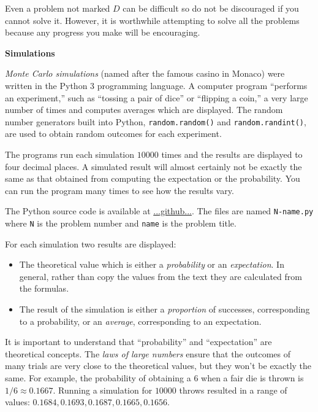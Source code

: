 Even a problem not marked $D$ can be difficult so do not be discouraged if you cannot solve it. However, it is worthwhile attempting to solve all the problems because any progress you make will be encouraging.

\newpage

\textbf{Simulations}

\emph{Monte Carlo simulations} (named after the famous casino in Monaco) were written in the Python 3 programming language. A computer program ``performs an experiment,'' such as ``tossing a pair of dice'' or ``flipping a coin,'' a very large number of times and computes averages which are displayed. The random number generators built into Python, \verb+random.random()+ and \verb+random.randint()+, are used to obtain random outcomes for each experiment.

The programs run each simulation $10000$ times and the results are displayed to four decimal places. A simulated result will almost certainly not be exactly the same as that obtained from computing the expectation or the probability. You can run the program many times to see how the results vary.

The Python source code is available at \url{...github...}. The files are named \verb+N-name.py+ where \verb+N+ is the problem number and \verb+name+ is the problem title.

For each simulation two results are displayed: 
\begin{itemize}
\item The theoretical value which is either a \emph{probability} or an \emph{expectation}. In general, rather than copy the values from the text they are calculated from the formulas. 
\item The result of the simulation is either a \emph{proportion} of successes, corresponding to a probability, or an \emph{average}, corresponding to an expectation.
\end{itemize}
It is important to understand that ``probability'' and ``expectation'' are theoretical concepts. The \emph{laws of large numbers} ensure that the outcomes of many trials are very close to the theoretical values, but they won't be exactly the same. For example, the probability of obtaining a $6$ when a fair die is thrown is $1/6\approx 0.1667$. Running a simulation for $10000$ throws resulted in a range of values: $0.1684, 0.1693, 0.1687, 0.1665, 0.1656$.

\newpage
